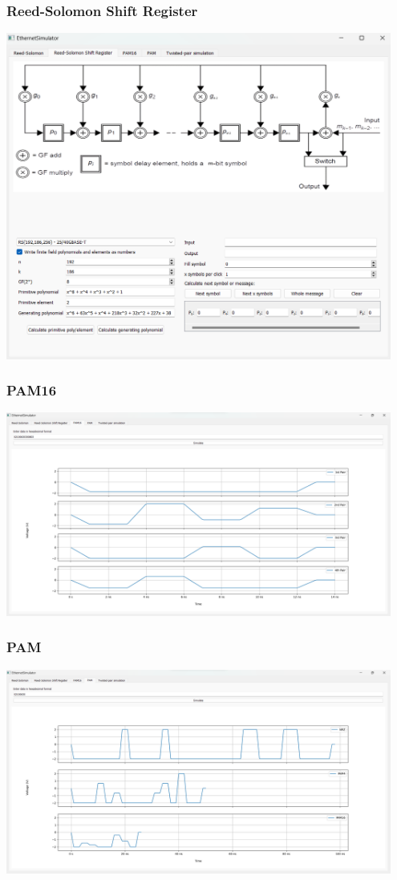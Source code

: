 \documentclass{beamer}
\begin{document}
\begin{frame}
\frametitle{Reed-Solomon Shift Register}
\includegraphics[width=0.95\textwidth]{images/prezentacja_rs_sr.png}
\end{frame}

\begin{frame}
\frametitle{PAM16}
\includegraphics[width=0.95\textwidth]{images/prezentacja_pam16.png}
\end{frame}

\begin{frame}
\frametitle{PAM}
\includegraphics[width=0.95\textwidth]{images/prezentacja_pam.png}
\end{frame}
\end{document}
